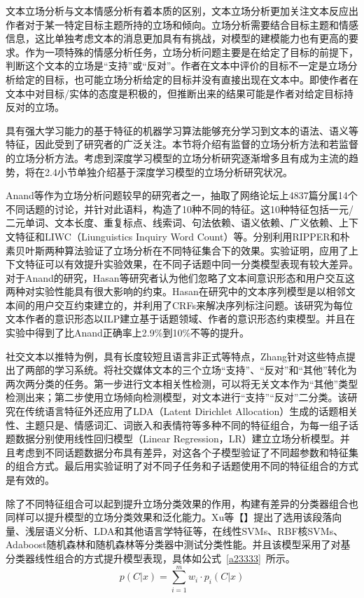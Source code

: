 文本立场分析与文本情感分析有着本质的区别，文本立场分析更加关注文本反应出作者对于某一特定目标主题所持的立场和倾向。立场分析需要结合目标主题和情感信息，这比单独考虑文本的消息更加具有有挑战，对模型的建模能力也有更高的要求。作为一项特殊的情感分析任务，立场分析问题主要是在给定了目标的前提下，判断这个文本的立场是“支持”或“反对”。作者在文本中评价的目标不一定是立场分析给定的目标，也可能立场分析给定的目标并没有直接出现在文本中。即使作者在文本中对目标/实体的态度是积极的，但推断出来的结果可能是作者对给定目标持反对的立场。

具有强大学习能力的基于特征的机器学习算法能够充分学习到文本的语法、语义等特征，因此受到了研究者的广泛关注。本节将介绍有监督的立场分析方法和若监督的立场分析方法。考虑到深度学习模型的立场分析研究逐渐增多且有成为主流的趋势，将在2.4小节单独介绍基于深度学习模型的立场分析研究状况。



Anand等作为立场分析问题较早的研究者之一，抽取了网络论坛上4837篇分属14个不同话题的讨论，并针对此语料，构造了10种不同的特征。这10种特征包括一元/二元单词、文本长度、重复标点、线索词、句法依赖、语义依赖、广义依赖、上下文特征和LIWC（Liunguistics Inquiry Word Count）等。分别利用RIPPER和朴素贝叶斯两种算法验证了立场分析在不同特征集合下的效果。实验证明，应用了上下文特征可以有效提升实验效果，在不同子话题中同一分类模型表现有较大差异。对于Anand的研究，Hasan等研究者认为他们忽略了文本间意识形态和用户交互这两种对实验性能具有很大影响的约束。Hasan在研究中的文本序列模型是以相邻文本间的用户交互约束建立的，并利用了CRFs来解决序列标注问题。该研究为每位文本作者的意识形态以ILP建立基于话题领域、作者的意识形态约束模型。并且在实验中得到了比Anand正确率上2.9\%到10\%不等的提升。

社交文本以推特为例，具有长度较短且语言非正式等特点，Zhang针对这些特点提出了两部的学习系统。将社交媒体文本的三个立场“支持”、“反对”和“其他”转化为两次两分类的任务。第一步进行文本相关性检测，可以将无关文本作为“其他”类型检测出来；第二步使用立场倾向检测模型，对文本进行“支持”“反对”二分类。该研究在传统语言特征外还应用了LDA（Latent Dirichlet Allocation）生成的话题相关性、主题只是、情感词汇、词嵌入和表情符等多种不同的特征组合，为每一组子话题数据分别使用线性回归模型（Linear Regression，LR）建立立场分析模型。并且考虑到不同话题数据分布具有差异，对这各个子模型验证了不同超参数和特征集的组合方式。最后用实验证明了对不同子任务和子话题使用不同的特征组合的方式是有效的。

除了不同特征组合可以起到提升立场分类效果的作用，构建有差异的分类器组合也同样可以提升模型的立场分类效果和泛化能力。Xu等【】提出了选用该段落向量、浅层语义分析、LDA和其他语言学特征等，在线性SVMs、RBF核SVMs、Adaboost随机森林和随机森林等分类器中测试分类性能。并且该模型采用了对基分类器线性组合的方式提升模型表现，具体如公式~\ref{a23333}~所示。
\begin{equation}\label{a23333}
p(C|x)=\sum_{i=1}^m w_i \cdot p_i(C|x)
\end{equation}

